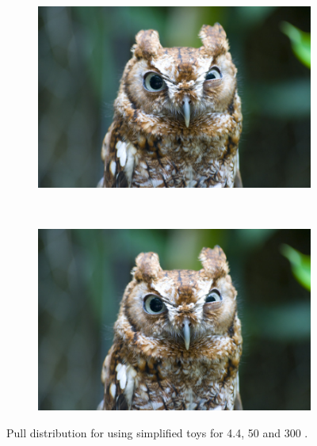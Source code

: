 {\begin{figure}[htbp]
   \begin{subfigure}[b]{0.48\textwidth}
        \includegraphics[width= \textwidth]{./Figs/placeholder.jpeg}
    \end{subfigure}
   ~ %
    \begin{subfigure}[b]{0.48\textwidth}
       \includegraphics[width=\textwidth]{./Figs/placeholder.jpeg}
   \end{subfigure}
    \caption{Pull distribution for \Gmumu using simplified toys for 4.4, 50 and 300 \fb.}
    \label{fig:gammapulls}
\end{figure}





}
